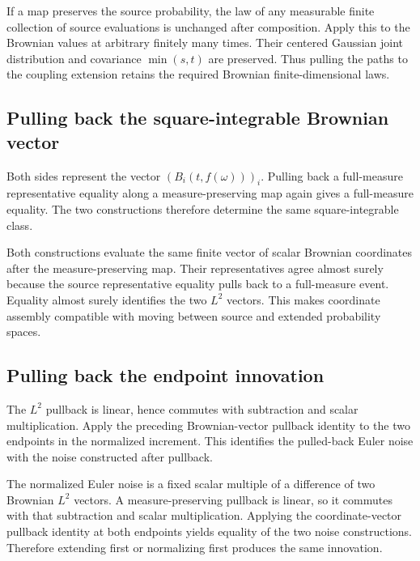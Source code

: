 \documentclass[11pt,a4paper]{report}
\begin{document}
If a map preserves the source probability, the law of any measurable finite collection of source evaluations is unchanged after composition. Apply this to the Brownian values at arbitrary finitely many times. Their centered Gaussian joint distribution and covariance \(\min(s,t)\) are preserved. Thus pulling the paths to the coupling extension retains the required Brownian finite-dimensional laws.

\subsection{\texorpdfstring{Pulling back the square-integrable Brownian vector}{Pulling back the square-integrable Brownian vector}}
\label{report-step-UnadjustedLangevin-ProductBrownian-lean-2}


Both sides represent the vector \((B_i(t,f(\omega)))_i\). Pulling back a full-measure representative equality along a measure-preserving map again gives a full-measure equality. The two constructions therefore determine the same square-integrable class.



Both constructions evaluate the same finite vector of scalar Brownian coordinates after the measure-preserving map. Their representatives agree almost surely because the source representative equality pulls back to a full-measure event. Equality almost surely identifies the two \(L^2\) vectors. This makes coordinate assembly compatible with moving between source and extended probability spaces.

\subsection{\texorpdfstring{Pulling back the endpoint innovation}{Pulling back the endpoint innovation}}
\label{report-step-UnadjustedLangevin-ProductBrownian-lean-3}


The \(L^2\) pullback is linear, hence commutes with subtraction and scalar multiplication. Apply the preceding Brownian-vector pullback identity to the two endpoints in the normalized increment. This identifies the pulled-back Euler noise with the noise constructed after pullback.



The normalized Euler noise is a fixed scalar multiple of a difference of two Brownian \(L^2\) vectors. A measure-preserving pullback is linear, so it commutes with that subtraction and scalar multiplication. Applying the coordinate-vector pullback identity at both endpoints yields equality of the two noise constructions. Therefore extending first or normalizing first produces the same innovation.
\end{document}
